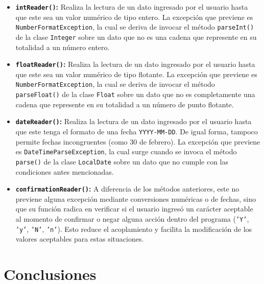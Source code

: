 \documentclass[12pt,letterpaper]{article}
\begin{document}
\begin{itemize}
    \item \textbf{\texttt{intReader()}:} Realiza la lectura de un dato ingresado por el usuario hasta que este sea un valor numérico de tipo entero. La excepción que previene es \texttt{NumberFormatException}, la cual se deriva de invocar el método \texttt{parseInt()} de la clase \texttt{Integer} sobre un dato que no es una cadena que represente en su totalidad a un número entero.
    \item \textbf{\texttt{floatReader()}:} Realiza la lectura de un dato ingresado por el usuario hasta que este sea un valor numérico de tipo flotante. La excepción que previene es \texttt{NumberFormatException}, la cual se deriva de invocar el método \texttt{parseFloat()} de la clase \texttt{Float} sobre un dato que no es completamente una cadena que represente en su totalidad a un número de punto flotante.
    \item \textbf{\texttt{dateReader()}:} Realiza la lectura de un dato ingresado por el usuario hasta que este tenga el formato de una fecha \texttt{YYYY-MM-DD}. De igual forma, tampoco permite fechas incongruentes (como 30 de febrero). La excepción que previene es \texttt{DateTimeParseException}, la cual surge cuando se invoca el método \texttt{parse()} de la clase \texttt{LocalDate} sobre un dato que no cumple con las condiciones antes mencionadas.
    \item \textbf{\texttt{confirmationReader()}:} A diferencia de los métodos anteriores, este no previene alguna excepción mediante conversiones numéricas o de fechas, sino que su función radica en verificar si el usuario ingresó un carácter aceptable al momento de confirmar o negar alguna acción dentro del programa (\texttt{'Y'}, \texttt{'y'}, \texttt{'N'}, \texttt{'n'}). Esto reduce el acoplamiento y facilita la modificación de los valores aceptables para estas situaciones.
\end{itemize}

\section{Conclusiones}
\end{document}
